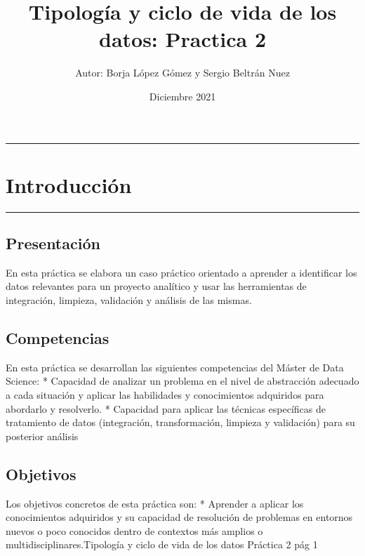 \documentclass[
]{article}
\title{Tipología y ciclo de vida de los datos: Practica 2}
\author{Autor: Borja López Gómez y Sergio Beltrán Nuez}
\date{Diciembre 2021}
\begin{document}
\maketitle

{
\setcounter{tocdepth}{2}
\tableofcontents
}
\newpage

\begin{center}\rule{0.5\linewidth}{0.5pt}\end{center}

\hypertarget{introducciuxf3n}{%
\section{Introducción}\label{introducciuxf3n}}

\begin{center}\rule{0.5\linewidth}{0.5pt}\end{center}

\hypertarget{presentaciuxf3n}{%
\subsection{Presentación}\label{presentaciuxf3n}}

En esta práctica se elabora un caso práctico orientado a aprender a
identificar los datos relevantes para un proyecto analítico y usar las
herramientas de integración, limpieza, validación y análisis de las
mismas.

\hypertarget{competencias}{%
\subsection{Competencias}\label{competencias}}

En esta práctica se desarrollan las siguientes competencias del Máster
de Data Science: * Capacidad de analizar un problema en el nivel de
abstracción adecuado a cada situación y aplicar las habilidades y
conocimientos adquiridos para abordarlo y resolverlo. * Capacidad para
aplicar las técnicas específicas de tratamiento de datos (integración,
transformación, limpieza y validación) para su posterior análisis

\hypertarget{objetivos}{%
\subsection{Objetivos}\label{objetivos}}

Los objetivos concretos de esta práctica son: * Aprender a aplicar los
conocimientos adquiridos y su capacidad de resolución de problemas en
entornos nuevos o poco conocidos dentro de contextos más amplios o
multidisciplinares.Tipología y ciclo de vida de los datos Práctica 2 pág
1
\end{document}
